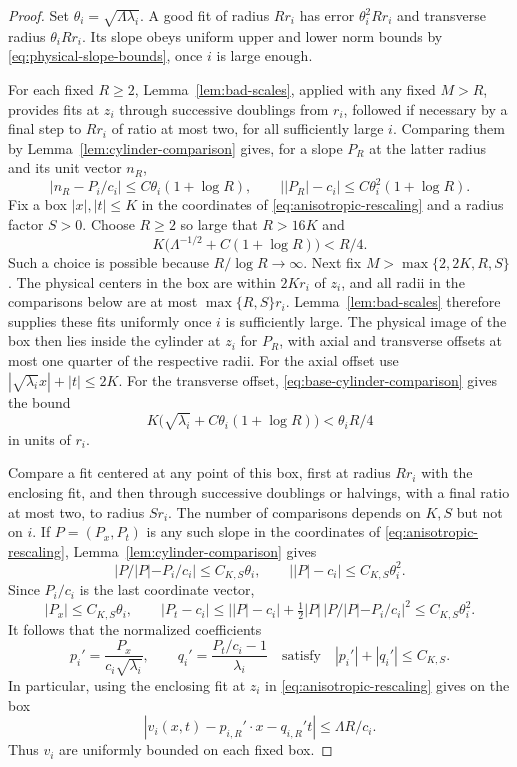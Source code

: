 \documentclass[11pt]{article}
\numberwithin{equation}{section}
\theoremstyle{definition}
\theoremstyle{remark}
\begin{document}
\begin{proof}
Set $\theta_i=\sqrt{\Lambda\lambda_i}$. A good fit of radius $Rr_i$ has error $\theta_i^2Rr_i$ and transverse radius $\theta_i Rr_i$. Its slope obeys uniform upper and lower norm bounds by \eqref{eq:physical-slope-bounds}, once $i$ is large enough.

For each fixed $R\ge2$, Lemma~\ref{lem:bad-scales}, applied with any fixed $M>R$, provides fits at $z_i$ through successive doublings from $r_i$, followed if necessary by a final step to $Rr_i$ of ratio at most two, for all sufficiently large $i$. Comparing them by Lemma~\ref{lem:cylinder-comparison} gives, for a slope $P_R$ at the latter radius and its unit vector $n_R$,
\begin{equation}\label{eq:base-cylinder-comparison}
  |n_R-P_i/c_i|\le C\theta_i(1+\log R),\qquad
  \bigl||P_R|-c_i\bigr|\le C\theta_i^2(1+\log R).
\end{equation}
Fix a box $|x|,|t|\le K$ in the coordinates of \eqref{eq:anisotropic-rescaling} and a radius factor $S>0$. Choose $R\ge2$ so large that $R>16K$ and
\[
  K\bigl(\Lambda^{-1/2}+C(1+\log R)\bigr)<R/4.
\]
Such a choice is possible because $R/\log R\to\infty$. Next fix $M>\max\{2,2K,R,S\}$. The physical centers in the box are within $2Kr_i$ of $z_i$, and all radii in the comparisons below are at most $\max\{R,S\}r_i$. Lemma~\ref{lem:bad-scales} therefore supplies these fits uniformly once $i$ is sufficiently large. The physical image of the box then lies inside the cylinder at $z_i$ for $P_R$, with axial and transverse offsets at most one quarter of the respective radii. For the axial offset use $|\sqrt{\lambda_i}x|+|t|\le2K$. For the transverse offset, \eqref{eq:base-cylinder-comparison} gives the bound
\[
  K\bigl(\sqrt{\lambda_i}+C\theta_i(1+\log R)\bigr)<\theta_i R/4
\]
in units of $r_i$.

Compare a fit centered at any point of this box, first at radius $Rr_i$ with the enclosing fit, and then through successive doublings or halvings, with a final ratio at most two, to radius $Sr_i$. The number of comparisons depends on $K,S$ but not on $i$. If $P=(P_x,P_t)$ is any such slope in the coordinates of \eqref{eq:anisotropic-rescaling}, Lemma~\ref{lem:cylinder-comparison} gives
\[
  |P/|P|-P_i/c_i|\le C_{K,S}\theta_i,
  \qquad \bigl||P|-c_i\bigr|\le C_{K,S}\theta_i^2.
\]
Since $P_i/c_i$ is the last coordinate vector,
\[
  |P_x|\le C_{K,S}\theta_i,\qquad
  |P_t-c_i|\le\bigl||P|-c_i\bigr|
      +\tfrac12|P|\,|P/|P|-P_i/c_i|^2
      \le C_{K,S}\theta_i^2.
\]
It follows that the normalized coefficients
\begin{equation}\label{eq:normalized-fit-slopes}
  p_i'=\frac{P_x}{c_i\sqrt{\lambda_i}},\qquad
  q_i'=\frac{P_t/c_i-1}{\lambda_i}
  \quad\text{satisfy}\quad |p_i'|+|q_i'|\le C_{K,S}.
\end{equation}
In particular, using the enclosing fit at $z_i$ in \eqref{eq:anisotropic-rescaling} gives on the box
\[
  |v_i(x,t)-p_{i,R}'\cdot x-q_{i,R}'t|\le\Lambda R/c_i.
\]
Thus $v_i$ are uniformly bounded on each fixed box.


\end{proof}
\end{document}
